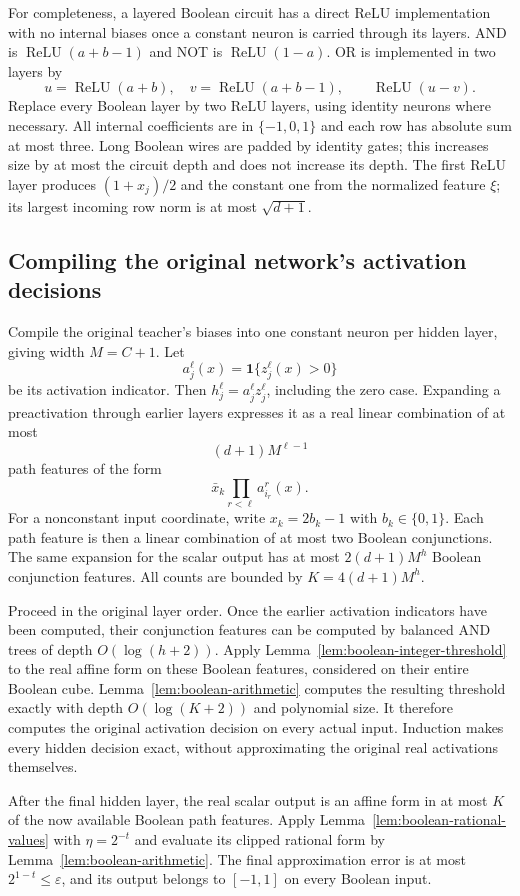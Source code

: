 For completeness, a layered Boolean circuit has a direct ReLU implementation with no internal biases once a constant neuron is carried through its layers. AND is $\operatorname{ReLU}(a+b-1)$ and NOT is $\operatorname{ReLU}(1-a)$. OR is implemented in two layers by
\[
 u=\operatorname{ReLU}(a+b),\quad v=\operatorname{ReLU}(a+b-1),
 \qquad\operatorname{ReLU}(u-v).
\]
Replace every Boolean layer by two ReLU layers, using identity neurons where necessary. All internal coefficients are in $\{-1,0,1\}$ and each row has absolute sum at most three. Long Boolean wires are padded by identity gates; this increases size by at most the circuit depth and does not increase its depth. The first ReLU layer produces $(1+x_j)/2$ and the constant one from the normalized feature $\xi$; its largest incoming row norm is at most $\sqrt{d+1}$.

\subsection{Compiling the original network's activation decisions}
Compile the original teacher's biases into one constant neuron per hidden layer, giving width $M=C+1$. Let
\[
 a_j^\ell(x)=\mathbf1\{z_j^\ell(x)>0\}
\]
be its activation indicator. Then $h_j^\ell=a_j^\ell z_j^\ell$, including the zero case. Expanding a preactivation through earlier layers expresses it as a real linear combination of at most
\[
 (d+1)M^{\ell-1}
\]
path features of the form
\[
 \bar x_k\prod_{r<\ell}a_{i_r}^r(x).
\]
For a nonconstant input coordinate, write $x_k=2b_k-1$ with $b_k\in\{0,1\}$. Each path feature is then a linear combination of at most two Boolean conjunctions. The same expansion for the scalar output has at most $2(d+1)M^h$ Boolean conjunction features. All counts are bounded by $K=4(d+1)M^h$.

Proceed in the original layer order. Once the earlier activation indicators have been computed, their conjunction features can be computed by balanced AND trees of depth $O(\log(h+2))$. Apply Lemma~\ref{lem:boolean-integer-threshold} to the real affine form on these Boolean features, considered on their entire Boolean cube. Lemma~\ref{lem:boolean-arithmetic} computes the resulting threshold exactly with depth $O(\log(K+2))$ and polynomial size. It therefore computes the original activation decision on every actual input. Induction makes every hidden decision exact, without approximating the original real activations themselves.

After the final hidden layer, the real scalar output is an affine form in at most $K$ of the now available Boolean path features. Apply Lemma~\ref{lem:boolean-rational-values} with $\eta=2^{-t}$ and evaluate its clipped rational form by Lemma~\ref{lem:boolean-arithmetic}. The final approximation error is at most $2^{1-t}\le\varepsilon$, and its output belongs to $[-1,1]$ on every Boolean input.

